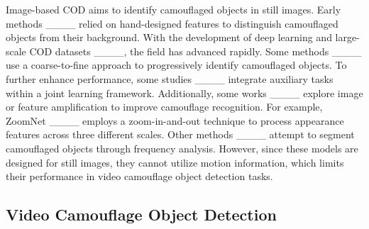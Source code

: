 Image-based COD aims to identify camouflaged objects in still images. Early methods ____ relied on hand-designed features to distinguish camouflaged objects from their background. With the development of deep learning and large-scale COD datasets ____, the field has advanced rapidly. Some methods ____ use a coarse-to-fine approach to progressively identify camouflaged objects. To further enhance performance, some studies ____ integrate auxiliary tasks within a joint learning framework. Additionally, some works ____ explore image or feature amplification to improve camouflage recognition. For example, ZoomNet ____ employs a zoom-in-and-out technique to process appearance features across three different scales. Other methods ____ attempt to segment camouflaged objects through frequency analysis. However, since these models are designed for still images, they cannot utilize motion information, which limits their performance in video camouflage object detection tasks.





\subsection{Video Camouflage Object Detection}


